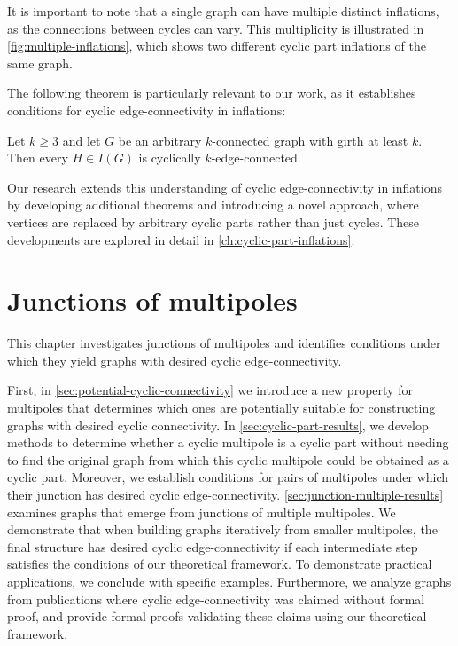 \documentclass[12pt, twoside]{book}
\begin{document}
It is important to note that a single graph can have multiple distinct inflations, as the connections between cycles can vary. This multiplicity is illustrated in \cref{fig:multiple-inflations}, which shows two different cyclic part inflations of the same graph.

The following theorem is particularly relevant to our work, as it establishes conditions for cyclic edge-connectivity in inflations:

\begin{theorem}\label{th:inflations-cyclic-connectivity}
	Let $k \geq 3$ and let $G$ be an arbitrary $k$-connected graph with girth at least $k$. Then every $H \in I(G)$ is cyclically $k$-edge-connected.
\end{theorem}

Our research extends this understanding of cyclic edge-connectivity in inflations by developing additional theorems and introducing a novel approach, where vertices are replaced by arbitrary cyclic parts rather than just cycles. These developments are explored in detail in \cref{ch:cyclic-part-inflations}.

\chapter{Junctions of multipoles}\label{ch:junctions-of-multipoles}

This chapter investigates junctions of multipoles and identifies conditions under which they yield graphs with desired cyclic edge-connectivity.

First, in \cref{sec:potential-cyclic-connectivity} we introduce a new property for multipoles that determines which ones are potentially suitable for constructing graphs with desired cyclic connectivity. In \cref{sec:cyclic-part-results}, we develop methods to determine whether a cyclic multipole is a cyclic part without needing to find the original graph from which this cyclic multipole could be obtained as a cyclic part. Moreover, we establish conditions for pairs of multipoles under which their junction has desired cyclic edge-connectivity. \cref{sec:junction-multiple-results} examines graphs that emerge from junctions of multiple multipoles. We demonstrate that when building graphs iteratively from smaller multipoles, the final structure has desired cyclic edge-connectivity if each intermediate step satisfies the conditions of our theoretical framework. To demonstrate practical applications, we conclude with specific examples. Furthermore, we analyze graphs from publications \cite{Kochol1996, Macajova2006} where cyclic edge-connectivity was claimed without formal proof, and provide formal proofs validating these claims using our theoretical framework.
\end{document}
